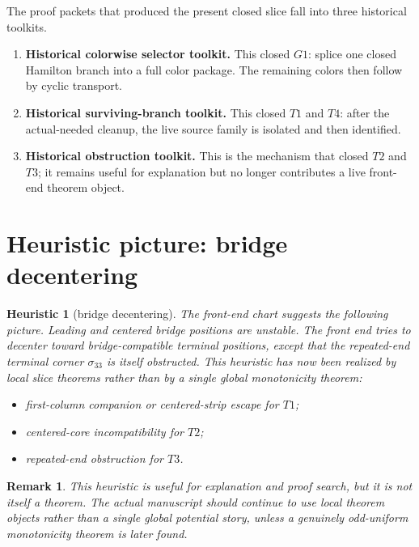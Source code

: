 \documentclass[11pt]{article}
\newtheorem{remark}[theorem]{Remark}
\newtheorem{heuristic}[theorem]{Heuristic}
\newcommand{\sig}[2]{\sigma_{#1#2}}
\begin{document}
The proof packets that produced the present closed slice fall into three
historical toolkits.
\begin{enumerate}[label=\textup{(\arabic*)},leftmargin=2.8em]
\item \textbf{Historical colorwise selector toolkit.}
      This closed \(G1\): splice one closed Hamilton branch into a full
      color package.  The remaining colors then follow by cyclic transport.
\item \textbf{Historical surviving-branch toolkit.}
      This closed \(T1\) and \(T4\): after the actual-needed cleanup, the live
      source family is isolated and then identified.
\item \textbf{Historical obstruction toolkit.}
      This is the mechanism that closed \(T2\) and \(T3\); it remains useful for
      explanation but no longer contributes a live front-end theorem object.
\end{enumerate}

\section{Heuristic picture: bridge decentering}

\begin{heuristic}[bridge decentering]
The front-end chart suggests the following picture.
Leading and centered bridge positions are unstable.
The front end tries to decenter toward bridge-compatible terminal positions,
except that the repeated-end terminal corner \(\sig33\) is itself obstructed.
This heuristic has now been realized by local slice theorems rather than by a
single global monotonicity theorem:
\begin{itemize}[leftmargin=2.4em]
\item first-column companion or centered-strip escape for \(T1\);
\item centered-core incompatibility for \(T2\);
\item repeated-end obstruction for \(T3\).
\end{itemize}
\end{heuristic}

\begin{remark}
This heuristic is useful for explanation and proof search, but it is not itself
a theorem.
The actual manuscript should continue to use local theorem objects rather than a
single global potential story, unless a genuinely odd-uniform monotonicity
theorem is later found.
\end{remark}
\end{document}
